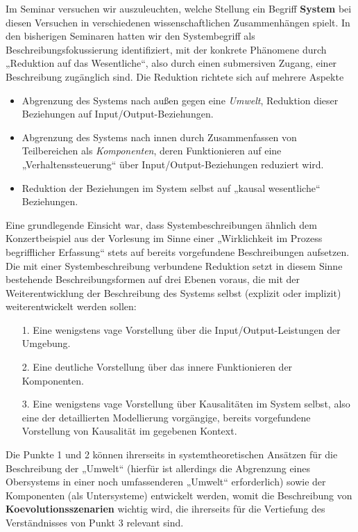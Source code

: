 \documentclass[11pt,a4paper]{article}
\begin{document}
Im Seminar versuchen wir auszuleuchten, welche Stellung ein Begriff
\textbf{System} bei diesen Versuchen in verschiedenen wissenschaftlichen
Zusammenhängen spielt. In den bisherigen Seminaren hatten wir den
Systembegriff als Beschreibungsfokussierung identifiziert, mit der konkrete
Phänomene durch „Reduktion auf das Wesentliche“, also durch einen submersiven
Zugang, einer Beschreibung zugänglich sind. Die Reduktion richtete sich auf
mehrere Aspekte
\begin{itemize}[noitemsep]
\item Abgrenzung des Systems nach außen gegen eine \emph{Umwelt}, Reduktion
  dieser Beziehungen auf Input/Output-Beziehungen.
\item Abgrenzung des Systems nach innen durch Zusammenfassen von Teilbereichen
  als \emph{Komponenten}, deren Funktionieren auf eine „Verhaltenssteuerung“
  über Input/Output-Be\-ziehungen reduziert wird.
\item Reduktion der Beziehungen im System selbst auf „kausal wesentliche“
  Beziehungen.
\end{itemize}
Eine grundlegende Einsicht war, dass Systembeschreibungen ähnlich dem
Konzertbeispiel aus der Vorlesung im Sinne einer „Wirklichkeit im
Prozess begriff\-licher Erfassung“ stets auf bereits vorgefundene
Beschreibungen aufsetzen. Die mit einer Systembeschreibung verbundene
Reduktion setzt in diesem Sinne bestehende Beschreibungsformen auf drei
Ebenen voraus, die mit der Weiterentwicklung der Beschreibung des
Systems selbst (explizit oder implizit) weiterentwickelt werden sollen:
\begin{itemize}[noitemsep]
\item[1.] Eine wenigstens vage Vorstellung über die Input/Output-Leistungen
  der Umgebung.
\item[2.] Eine deutliche Vorstellung über das innere Funktionieren der
  Komponenten.
\item[3.] Eine wenigstens vage Vorstellung über Kausalitäten im System selbst,
  also eine der detaillierten Modellierung vorgängige, bereits vorgefundene
  Vorstellung von Kausalität im gegebenen Kontext.
\end{itemize}
Die Punkte 1 und 2 können ihrerseits in systemtheoretischen Ansätzen für die
Beschreibung der „Umwelt“ (hierfür ist allerdings die Abgrenzung eines
Obersystems in einer noch umfassenderen „Umwelt“ erforderlich) sowie der
Komponenten (als Untersysteme) entwickelt werden, womit die Beschreibung von
\textbf{Koevolutionsszenarien} wichtig wird, die ihrerseits für die Vertiefung
des Verständnisses von Punkt 3 relevant sind.
\end{document}
